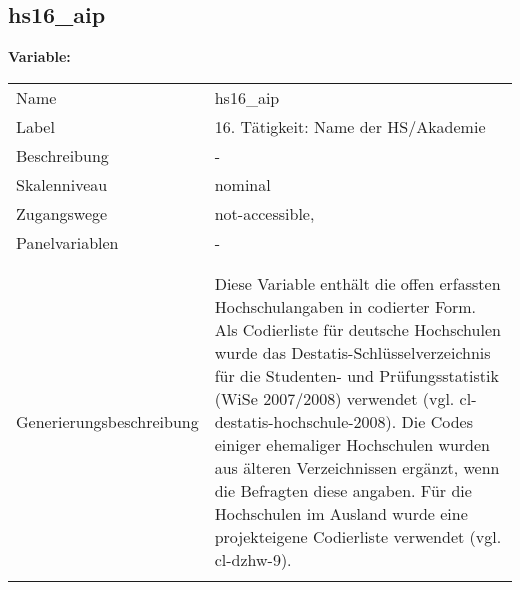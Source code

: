 	
	
	\subsection{hs16\_aip}
	\label{subSection:hs16_aip}

	\noindent\textbf{Variable:}\\
		\begin{tabular}{lL{11.3cm}}
			\label{tableVariable:hs16_aip}
			Name & hs16\_aip \\
			Label & 16. Tätigkeit: Name der HS/Akademie \\
			Beschreibung & - \\
			Skalenniveau & nominal \\
			Zugangswege &
				not-accessible,
 \\
			Panelvariablen & -
			 \\
			 \\
 \\
					Generierungsbeschreibung & Diese Variable enthält die offen erfassten Hochschulangaben in codierter Form. Als Codierliste für deutsche Hochschulen wurde das Destatis-Schlüsselverzeichnis für die Studenten- und Prüfungsstatistik (WiSe 2007/2008) verwendet (vgl. cl-destatis-hochschule-2008). Die Codes einiger ehemaliger Hochschulen wurden aus älteren Verzeichnissen ergänzt, wenn die Befragten diese angaben. Für die Hochschulen  im Ausland wurde eine projekteigene Codierliste verwendet (vgl. cl-dzhw-9). 
				 \\	
			 \\
		\end{tabular}






	
	\newpage
